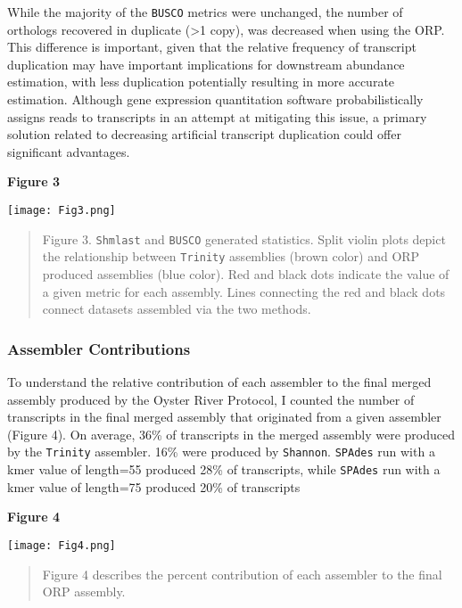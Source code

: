 \documentclass[10pt,letterpaper]{article}
\begin{document}
While the majority of the \texttt{BUSCO} metrics were unchanged, the number of orthologs recovered in duplicate (\textgreater 1 copy), was decreased when using the ORP. This difference is important, given that the relative frequency of transcript duplication may have important implications for downstream abundance estimation, with less  duplication potentially resulting in more accurate estimation. Although gene expression quantitation software \citep{Patro:2017iv,Bray:2016ee} probabilistically assigns reads to transcripts in an attempt at mitigating this issue, a primary solution related to decreasing artificial transcript duplication could offer significant advantages.


\textbf{\hypertarget{Figure 3}{Figure 3}} \\
\centerline{\texttt{[image: Fig3.png]}}
\begin{quote}
\small{Figure 3. \texttt{Shmlast} and \texttt{BUSCO} generated statistics. Split violin plots depict the relationship between \texttt{Trinity} assemblies (brown color) and ORP produced assemblies (blue color). Red and black dots indicate the value of a given metric for each assembly. Lines connecting the red and black dots connect datasets assembled via the two methods.}
\end{quote} 

\subsubsection{Assembler Contributions}

To understand the relative contribution of each assembler to the final merged assembly produced by the Oyster River Protocol, I counted the number of transcripts in the final merged assembly that originated from a given assembler (Figure 4). On average, 36\% of transcripts in the merged assembly were produced by the \texttt{Trinity} assembler. 16\% were produced by \texttt{Shannon}. \texttt{SPAdes} run with a kmer value of length=55 produced 28\% of transcripts, while \texttt{SPAdes} run with a kmer value of length=75 produced 20\% of transcripts 

\textbf{\hypertarget{Figure 4}{Figure 4}} \\
\centerline{\texttt{[image: Fig4.png]}}
\begin{quote}
\small{Figure 4 describes the percent contribution of each assembler to the final ORP assembly.}
\end{quote} 
\end{document}
